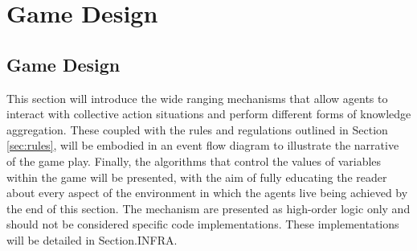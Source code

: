\chapter{Game Design}\label{game design}






\section{Game Design}\label{sec: game design}

This section will introduce the wide ranging mechanisms that allow agents to interact with collective action situations and perform different forms of knowledge aggregation. These coupled with the rules and regulations outlined in Section \ref{sec:rules}, will be embodied in an event flow diagram to illustrate the narrative of the game play. Finally, the algorithms that control the values of variables within the game will be presented, with the aim of fully educating the reader about every aspect of the environment in which the agents live being achieved by the end of this section. The mechanism are presented as high-order logic only and should not be considered specific code implementations. These implementations will be detailed in Section.INFRA.


